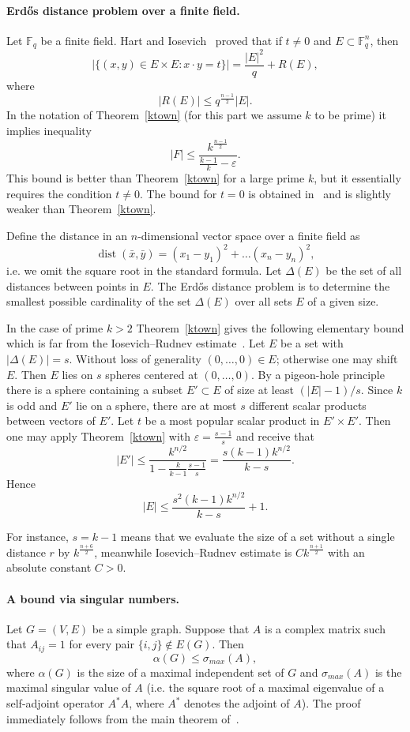 \documentclass[8pt]{article}
\DeclareMathOperator{\dist}{\operatorname{dist}}
\begin{document}
\paragraph{Erd{\H o}s distance problem over a finite field.}
Let $\mathbb{F}_q$ be a finite field. Hart and Iosevich~\cite{hart2008sums} proved that if $t \neq 0$ and $E \subset \mathbb{F}^n_q$, then
\[
|\{(x, y) \in E \times E :  x \cdot y = t\}| = \frac{|E|^2}{q} + R(E),
\]
where
\[
|R(E)| \leq q^\frac{n-1}{2} |E|.
\]
In the notation of Theorem~\ref{ktown} (for this part we assume $k$ to be prime) it implies inequality
\[
|F| \leq \frac{k^\frac{n-1}{2}}{\frac{k-1}{k} - \varepsilon}.
\]
This bound is better than Theorem~\ref{ktown} for a large prime $k$, but it essentially requires the condition $t \neq 0$. The bound for $t = 0$ is obtained in~\cite{hart2011averages} and is slightly weaker than Theorem~\ref{ktown}.


Define the distance in an $n$-dimensional vector space over a finite field as
\[
\dist(\bar x, \bar y) = (x_1 - y_1)^2 + \dots (x_n - y_n)^2,
\]
i.e. we omit the square root in the standard formula.
Let $\Delta(E)$ be the set of all distances between points in $E$.
The Erd{\H o}s distance problem is to determine the smallest possible cardinality of the set $\Delta(E)$ over all sets $E$ of a given size.


In the case of prime $k > 2$ Theorem~\ref{ktown} gives the following elementary bound which is far from the Iosevich--Rudnev estimate~\cite{iosevich2007erdos}.
Let $E$ be a set with $|\Delta(E)| = s$. Without loss of generality $(0,\dots,0) \in E$; otherwise one may shift $E$. 
Then $E$ lies on $s$ spheres centered at $(0,\dots,0)$. 
By a pigeon-hole principle there is a sphere containing a subset $E'\subset E$ of size at least $(|E|-1)/s$. 
Since $k$ is odd and $E'$ lie on a sphere, there are at most $s$ different scalar products between vectors of $E'$.
Let $t$ be a most popular scalar product in $E' \times E'$. Then one may apply Theorem~\ref{ktown} with $\varepsilon = \frac{s-1}{s}$ and receive that
\[
|E'| \leq \frac{k^{n/2}}{1 - \frac{k}{k-1}\frac{s-1}{s}} = \frac{s(k-1)k^{n/2}}{k-s}.
\]
Hence
\[
|E| \leq \frac{s^2(k-1)k^{n/2}}{k-s} + 1.
\]

For instance, $s = k-1$ means that we evaluate the size of a set without a single distance $r$ by $k^{{\frac{n+6}{2}}}$, meanwhile Iosevich--Rudnev estimate is
$Ck^{\frac{n+1}{2}}$ with an absolute constant $C > 0$.  


\paragraph{A bound via singular numbers.}
Let $G = (V,E)$ be a simple graph. Suppose that $A$ is a complex matrix such that $A_{ij} = 1$ for every pair $\{i,j\} \notin E(G)$.
Then
\[
\alpha(G) \leq \sigma_{max}(A),
\]
where $\alpha(G)$ is the size of a maximal independent set of $G$ and $\sigma_{max}(A)$ is the maximal singular value of $A$ (i.e. the square root of a
maximal eigenvalue of a self-adjoint operator $A^*A$, where $A^*$ denotes the adjoint of $A$).
The proof immediately follows from the main theorem of~\cite{danciger2006min}.
\end{document}
